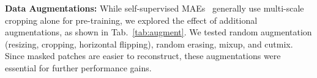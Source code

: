 \begin{table}[h!]
\vspace{-5pt}
\centering
\scriptsize
{}
\vspace{-5pt}
\captionsetup{font=footnotesize}
\caption{Action classification results on SSv2 show that CrossVideoMAE with a single sampled frame (n=1) performs as well or better than using multiple frames. We use n=1 in all experiments.}
\label{tab:sampled}
\vspace{-10pt}
\end{table}

\noindent\textbf{Data Augmentations:}
While self-supervised MAEs~\cite{he2022masked,tong2022videomae,feichtenhofer2022masked} generally use multi-scale cropping alone for pre-training, we explored the effect of additional augmentations, as shown in Tab.~\ref{tab:augment}. We tested random augmentation (resizing, cropping, horizontal flipping), random erasing, mixup, and cutmix. Since masked patches are easier to reconstruct, these augmentations were essential for further performance gains.

